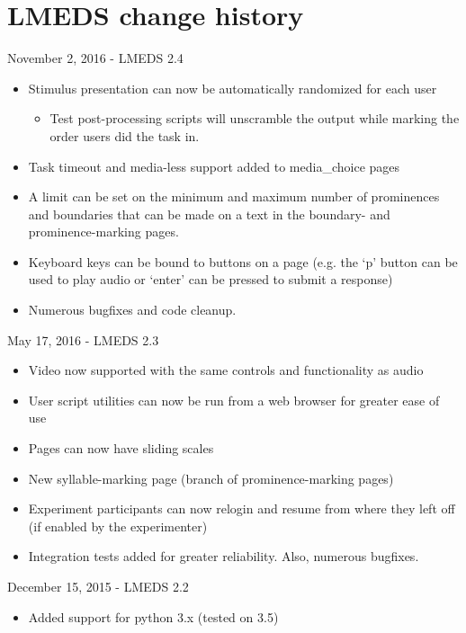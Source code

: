 
\section{LMEDS change history}

November 2, 2016 - LMEDS 2.4

\begin{itemize}
\item Stimulus presentation can now be automatically randomized for each user
\begin{itemize}
\item Test post-processing scripts will unscramble the output while marking the order users did the task in.
\end{itemize}
\item Task timeout and media-less support added to media\_choice pages
\item A limit can be set on the minimum and maximum number of prominences and boundaries that can be made on a text in the boundary- and prominence-marking pages.
\item Keyboard keys can be bound to buttons on a page (e.g. the `p' button can be used to play audio or `enter' can be pressed to submit a response)
\item Numerous bugfixes and code cleanup.
\end{itemize}

May 17, 2016 - LMEDS 2.3

\begin{itemize}
\item Video now supported with the same controls and functionality as audio
\item User script utilities can now be run from a web browser for greater ease of use
\item Pages can now have sliding scales
\item New syllable-marking page (branch of prominence-marking pages)
\item Experiment participants can now relogin and resume from where they left off (if enabled by the experimenter)
\item Integration tests added for greater reliability.  Also, numerous bugfixes.
\end{itemize}

December 15, 2015 - LMEDS 2.2

\begin{itemize}
\item Added support for python 3.x (tested on 3.5)
\end{itemize}

